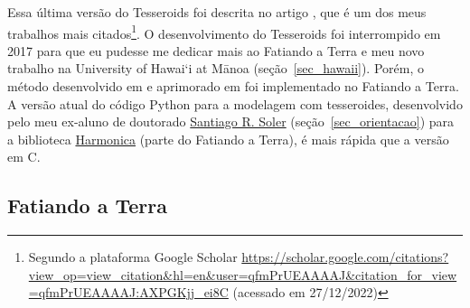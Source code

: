 \documentclass[10pt,a4paper,oneside]{book}
\newcommand{\UHM}{University of Hawai`i at M\={a}noa}
\newcommand{\SantiagoLink}{\href{https://www.santisoler.com/}{Santiago R. Soler}}
\begin{document}
Essa última versão do Tesseroids foi descrita no artigo \citet{Uieda2016}, que
é um dos meus trabalhos mais citados\footnote{Segundo a plataforma Google
Scholar
\url{https://scholar.google.com/citations?view_op=view_citation&hl=en&user=qfmPrUEAAAAJ&citation_for_view=qfmPrUEAAAAJ:AXPGKjj_ei8C}
(acessado em 27/12/2022)}.
O desenvolvimento do Tesseroids foi interrompido em 2017 para que eu pudesse me
dedicar mais ao Fatiando a Terra e meu novo trabalho na \UHM{}
(seção~\ref{sec_hawaii}).
Porém, o método desenvolvido em \citet{Uieda2016} e aprimorado em
\citet{Soler2019} foi implementado no Fatiando a Terra.
A versão atual do código Python para a modelagem com tesseroides, desenvolvido
pelo meu ex-aluno de doutorado \SantiagoLink{} (seção~\ref{sec_orientacao})
para a biblioteca \href{https://www.fatiando.org/harmonica/}{Harmonica} (parte
do Fatiando a Terra), é mais rápida que a versão em C.


\subsection{Fatiando a Terra}
\label{sec_fatiando}
\end{document}
